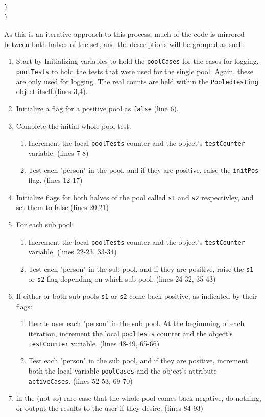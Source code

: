 \documentclass[letterpaper, 10pt]{article}
\begin{document}
\begin{addmargin}[-5em]{1em}
\begin{small}
\begin{verbatim}
}
}
\end{verbatim}
\end{small}
\end{addmargin}

As this is an iterative approach to this process, much of the code is mirrored between both halves of the set, and the descriptions will be grouped as such.

\begin{enumerate}
    \item Start by Initializing variables to hold the \texttt{poolCases} for the cases for logging, \texttt{poolTests} to hold the tests that were used for the single pool. Again, these are only used for logging. The real counts are held within the \texttt{PooledTesting} object itself.(lines 3,4).
    \item Initialize a flag for a positive pool as \texttt{false} (line 6).
    \item Complete the initial whole pool test.
       \begin{enumerate}
        \item Increment the local \texttt{poolTests} counter and the object's \texttt{testCounter} variable. (lines 7-8)
        \item Test each "person" in the pool, and if they are positive, raise the \texttt{initPos} flag. (lines 12-17)
        \end{enumerate}
    \item Initialize flags for both halves of the pool called \texttt{s1} and \texttt{s2} respectivley, and set them to false (lines 20,21)
    \item For each sub pool:
        \begin{enumerate}
            \item Increment the local \texttt{poolTests} counter and the object's \texttt{testCounter} variable. (lines 22-23, 33-34)
            \item Test each "person" in the sub pool, and if they are positive, raise the \texttt{s1} or \texttt{s2} flag depending on which sub pool. (lines 24-32, 35-43)
            \end{enumerate}
    \item If either or both sub pools \texttt{s1} or \texttt{s2} come back positive, as indicated by their flags:
        \begin{enumerate}
            \item Iterate over each "person" in the sub pool. At the beginnning of each iteration, increment the local \texttt{poolTests} counter and the object's \texttt{testCounter} variable. (lines 48-49, 65-66)
            \item Test each "person" in the sub pool, and if they are positive, increment both the local variable \texttt{poolCases} and the object's attribute \texttt{activeCases}. (lines 52-53, 69-70)
        \end{enumerate}
    \item in the (not so) rare case that the whole pool comes back negative, do nothing, or output the results to the user if they desire. (lines  84-93)
\end{enumerate}
\end{document}
